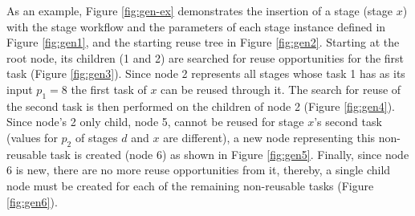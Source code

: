 As an example, Figure \ref{fig:gen-ex} demonstrates the insertion of a stage (stage $x$) with the stage workflow and the parameters of each stage instance defined in Figure \ref{fig:gen1}, and the starting reuse tree in Figure \ref{fig:gen2}. Starting at the root node, its children (1 and 2) are searched for reuse opportunities for the first task (Figure \ref{fig:gen3}). Since node 2 represents all stages whose task 1 has as its input $p_1 = 8$ the first task of $x$ can be reused through it. The search for reuse of the second task is then performed on the children of node 2 (Figure \ref{fig:gen4}). Since node's 2 only child, node 5, cannot be reused for stage $x$'s second task (values for $p_2$ of stages $d$ and $x$ are different), a new node representing this non-reusable task is created (node 6) as shown in Figure \ref{fig:gen5}. Finally, since node 6 is new, there are no more reuse opportunities from it, thereby, a single child node must be created for each of the remaining non-reusable tasks (Figure \ref{fig:gen6}).




